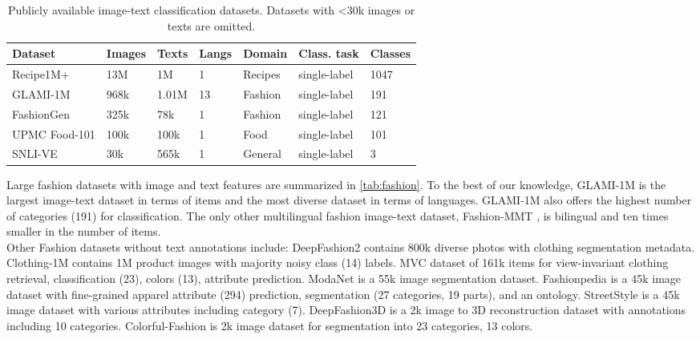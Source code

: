 \documentclass{bmvc2k}
\begin{document}
\begin{table}
\centering
\small
\caption{\label{tab:imageTextClassification} Publicly available image-text classification datasets.
Datasets with <30k images or texts are omitted.
}
\vspace{1mm}
\begin{tabular}{|l|l|l|l|l|l|l|}
\hline
Dataset                          & Images        & Texts         & Langs      & Domain           & Class. task    & Classes \\
\hline
Recipe1M+ \cite{recipe1m+}      & 13M           & 1M             & 1          & Recipes          & single-label    & 1047  \\
GLAMI-1M                        & 968k          & 1.01M          & 13         & Fashion          & single-label   & 191   \\
FashionGen \cite{fashiongen}     &325k           & 78k           & 1          & Fashion           & single-label  & 121 \\
UPMC Food-101 \cite{upmcFood101} &100k           & 100k          & 1          & Food              & single-label  & 101 \\
SNLI-VE \cite{Xie2019VisualEA}   & 30k            & 565k         & 1          & General           & single-label  & 3 \\
\hline
\end{tabular}
\vspace*{-5mm}
\end{table}


Large fashion datasets with image and text features are summarized in \autoref{tab:fashion}.
To the best of our knowledge, GLAMI-1M is the largest image-text dataset in terms of items and the most diverse dataset in terms of languages.
GLAMI-1M also offers the highest number of categories (191) for classification.
The only other multilingual fashion image-text dataset, Fashion-MMT \cite{fashionMMT}, is bilingual and ten times smaller in the number of items. \\




Other Fashion datasets without text annotations include:
DeepFashion2 \cite{deepfashion2} contains 800k diverse photos with clothing segmentation metadata.
Clothing-1M \cite{clothing1m} contains 1M product images with majority noisy class (14) labels.
MVC \cite{mvc} dataset of 161k items for view-invariant clothing retrieval, classification (23), colors (13), attribute prediction.
ModaNet \cite{modanet} is a 55k image segmentation dataset.
Fashionpedia \cite{fashionpedia} is a 45k image dataset with fine-grained apparel attribute (294) prediction, segmentation (27 categories, 19 parts), and an ontology.
StreetStyle \cite{streetStyle} is a 45k image dataset with various attributes including category (7).
DeepFashion3D \cite{deepfashion3d} is a 2k image to 3D reconstruction dataset with annotations including 10 categories.
Colorful-Fashion \cite{Liu2014FashionPW} is 2k image dataset for segmentation into 23 categories, 13 colors.
\end{document}
